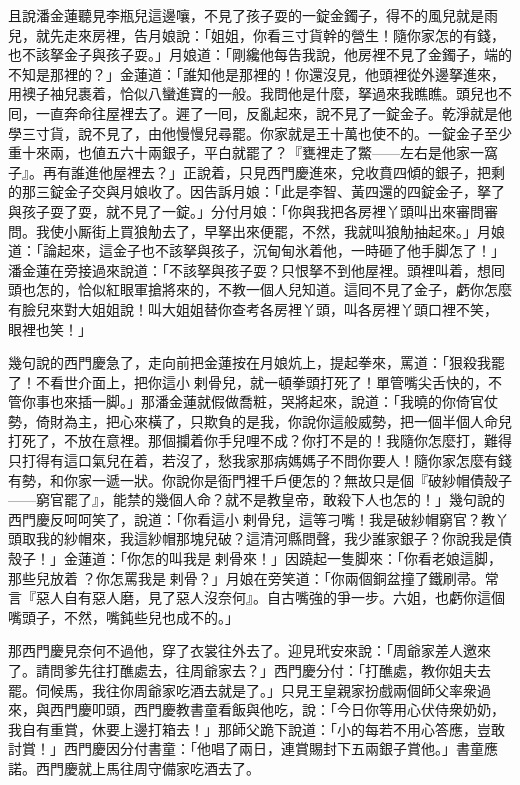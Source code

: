 且說潘金蓮聽見李瓶兒這邊嚷，不見了孩子耍的一錠金鐲子，得不的風兒就是雨兒，就先走來房裡，告月娘說：「姐姐，你看三寸貨幹的營生！隨你家怎的有錢，也不該拏金子與孩子耍。」月娘道：「剛纔他每告我說，他房裡不見了金鐲子，端的不知是那裡的？」金蓮道：「誰知他是那裡的！你還沒見，他頭裡從外邊拏進來，用襖子袖兒裹着，恰似八蠻進寶的一般。{}我問他是什麼，拏過來我瞧瞧。頭兒也不囘，一直奔命往屋裡去了。遲了一囘，反亂起來，說不見了一錠金子。乾淨就是他學三寸貨，說不見了，由他慢慢兒尋罷。你家就是王十萬也使不的。一錠金子至少重十來兩，也値五六十兩銀子，平白就罷了？『甕裡走了鱉——左右是他家一窩子』。再有誰進他屋裡去？」正說着，只見西門慶進來，兌收賁四傾的銀子，把剩的那三錠金子交與月娘收了。因告訴月娘：「此是李智、黃四還的四錠金子，拏了與孩子耍了耍，就不見了一錠。」分付月娘：「你與我把各房裡丫頭叫出來審問審問。我使小厮街上買狼觔去了，早拏出來便罷，不然，我就叫狼觔抽起來。」{}月娘道：「論起來，這金子也不該拏與孩子，沉甸甸氷着他，一時砸了他手脚怎了！」潘金蓮在旁接過來說道：{}「不該拏與孩子耍？只恨拏不到他屋裡。頭裡叫着，想囘頭也怎的，恰似紅眼軍搶將來的，不教一個人兒知道。這囘不見了金子，虧你怎麼有臉兒來對大姐姐說！叫大姐姐替你查考各房裡丫頭，叫各房裡丫頭口裡不笑，𣭈眼裡也笑！」

幾句說的西門慶急了，走向前把金蓮按在月娘炕上，提起拳來，罵道：「狠殺我罷了！不看世介面上，把你這小𢱉剌骨兒，就一頓拳頭打死了！單管嘴尖舌快的，不管你事也來插一脚。」那潘金蓮就假做喬粧，哭將起來，說道：「我曉的你倚官仗勢，倚財為主，把心來橫了，只欺負的是我，你說你這般威勢，把一個半個人命兒打死了，不放在意裡。那個攔着你手兒哩不成？你打不是的！我隨你怎麼打，難得只打得有這口氣兒在着，若沒了，愁我家那病媽媽子不問你要人！隨你家怎麼有錢有勢，和你家一遞一狀。你說你是衙門裡千戶便怎的？無故只是個『破紗帽債殼子——窮官罷了』，能禁的幾個人命？就不是教皇帝，敢殺下人也怎的！」{}幾句說的西門慶反呵呵笑了，說道：「你看這小𢱉剌骨兒，這等刁嘴！我是破紗帽窮官？教丫頭取我的紗帽來，我這紗帽那塊兒破？這清河縣問聲，我少誰家銀子？你說我是債殼子！」金蓮道：「你怎的叫我是𢱉剌骨來！」因蹺起一隻脚來：「你看老娘這脚，那些兒放着𢱉？你怎罵我是𢱉剌骨？」月娘在旁笑道：「你兩個銅盆撞了鐵刷帚。常言『惡人自有惡人磨，見了惡人沒奈何』。自古嘴強的爭一步。六姐，也虧你這個嘴頭子，不然，嘴鈍些兒也成不的。」

那西門慶見奈何不過他，穿了衣裳往外去了。迎見玳安來說：「周爺家差人邀來了。請問爹先往打醮處去，往周爺家去？」西門慶分付：「打醮處，教你姐夫去罷。伺候馬，我往你周爺家吃酒去就是了。」只見王皇親家扮戲兩個師父率衆過來，與西門慶叩頭，西門慶教書童看飯與他吃，說：「今日你等用心伏侍衆奶奶，我自有重賞，休要上邊打箱去！」那師父跪下說道：「小的每若不用心答應，豈敢討賞！」西門慶因分付書童：「他唱了兩日，連賞賜封下五兩銀子賞他。」書童應諾。西門慶就上馬往周守備家吃酒去了。

